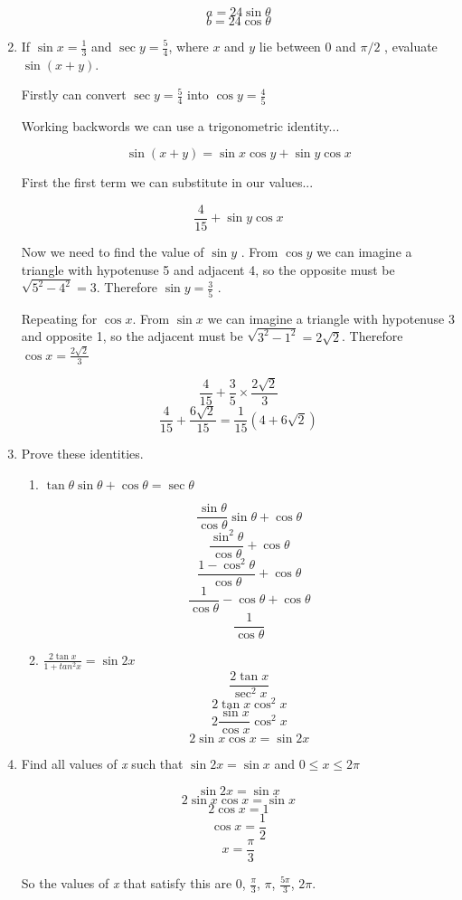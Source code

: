 \documentclass{article}
\begin{document}
\begin{enumerate}
			$$a = 24 \sin\theta$$
			$$b = 24 \cos\theta$$

		\item If $\sin x = \frac{1}{3}$ and $\sec y = \frac{5}{4}$, where $x$ and $y$ lie between 0 and
			$\pi/2$ , evaluate $\sin(x + y)$.

			Firstly can convert $\sec y = \frac{5}{4}$ into $\cos y = \frac{4}{5}$

			Working backwords we can use a trigonometric identity...

			$$ \sin (x + y) = \sin x\cos y + \sin y\cos x $$

			First the first term we can substitute in our values...

			$$ \frac{4}{15} + \sin y\cos{x} $$

			Now we need to find the value of $\sin y$ . From $\cos y $ we can imagine a triangle with
			hypotenuse 5 and adjacent 4, so the opposite must be $\sqrt{5^2 - 4^2} = 3$. Therefore
			$\sin y = \frac{3}{5}$ .

			Repeating for $\cos x$. From $\sin x$ we can imagine a triangle with hypotenuse 3 and
			opposite 1, so the adjacent must be $\sqrt{3^2 - 1^2} = 2\sqrt{2}$. Therefore
			$\cos x = \frac{2\sqrt{2}}{3}$

			$$ \frac{4}{15} + \frac{3}{5} \times \frac{2\sqrt{2}}{3}$$
			$$\frac{4}{15} + \frac{6\sqrt{2}}{15} = \frac{1}{15}(4 + 6\sqrt{2})$$

		\item Prove these identities.

		\begin{enumerate}
			\item $\tan \theta \sin \theta + \cos \theta = \sec \theta$

				$$ \frac{\sin \theta}{\cos \theta} \sin \theta + \cos \theta $$
				$$ \frac{\sin^2 \theta}{\cos \theta} + \cos \theta $$
				$$ \frac{1 - \cos^2 \theta}{\cos \theta} + \cos \theta $$
				$$ \frac{1}{\cos \theta} - \cos \theta + \cos \theta $$
				$$ \frac{1}{\cos \theta} $$

			\item $\frac{ 2 \tan x}{1 + tan^2 x} = \sin 2x$
				$$ \frac{2\tan x}{\sec^2 x} $$
				$$ 2 \tan x \cos^2 x $$
				$$ 2 \frac{\sin x}{\cos x}\cos^2 x $$
				$$ 2 \sin x \cos x = \sin 2x $$
		\end{enumerate}

		\item Find all values of \emph{x} such that $ \sin 2x = \sin x $ and $0 \leq x \leq 2 \pi $

			$$ \sin2x = \sin x $$
			$$ 2\sin x\cos x = \sin x $$
			$$ 2 \cos x = 1 $$
			$$ \cos x = \frac{1}{2} $$
			$$ x = \frac{\pi}{3} $$

			So the values of \emph{x} that satisfy this are 0, $\frac{\pi}{3}$, $\pi$, $\frac{5\pi}{3}$, $2\pi$.
\end{enumerate}
\end{document}
